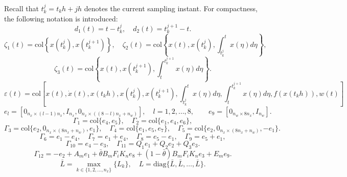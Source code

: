 \documentclass[preprint,review,fleqn,sort&compress,3p]{elsarticle}
\theoremstyle{definition} %
\theoremstyle{definition}%
\begin{document}
Recall that $t_k^j=t_k h+jh$ denotes the current sampling instant. For compactness, the following notation is introduced:
\begin{equation*}
	d_1(t) = t - t^j_k, \quad  
	d_2(t) = t^{j+1}_{k} - t.
\end{equation*}
\begin{equation*}
	\zeta_1(t) = \mathrm{col} \left\{ x(t^j_k),  x(t^{j+1}_{k}) \right\}, \quad
	\zeta_2(t) = \mathrm{col} \left\{ x(t), x(t_k^j), \int_{t_k^j}^t x(\eta) d\eta \right\},
\end{equation*}
\begin{equation*}
	\zeta_3(t) = \mathrm{col} \left\{ x(t), x(t_k^{j+1}), \int_t^{t_k^{j+1}} x(\eta) d\eta \right\}.
\end{equation*}
\begin{equation*}
	\varepsilon(t) = \mathrm{col}\left[
	x(t),   \dot{x}(t),   x(t_k h),
	x(t_k^j),   x(t^{j+1}_k),
	\int_{t_k^j}^{t} x(\eta) d\eta,
	\int_{t}^{t_k^{j+1}} x(\eta) d\eta,
	f(x(t_k h)),  w(t)
	\right]
\end{equation*}
\begin{equation*}
	e_l = \left[ 0_{n_x \times (l-1)n_x}, I_{n_x}, 0_{n_x \times ((8-l)n_x+n_w)} \right],\quad l = 1,2,\dots,8,\qquad e_9 = \left[ 0_{n_w \times 8n_x}, I_{n_w} \right].
\end{equation*}
\begin{equation*}
	\Gamma_{1}=\mathrm{col}\{e_{4},e_{5}\},\quad
	\Gamma_{2}=\mathrm{col}\{e_{1},e_{4},e_{6}\},
\end{equation*}
\begin{equation*}
	\Gamma_{3}=\mathrm{col}\{e_{2},0_{n_x\times (8n_x+n_w)},e_{1}\},\quad
	\Gamma_{4}=\mathrm{col}\{e_{1},e_{5},e_{7}\},\quad
	\Gamma_{5}=\mathrm{col}\{e_{2},0_{n_x\times (8n_x+n_w)},-e_{1}\}.
\end{equation*}
\begin{equation*}
	\Gamma_{6}=e_{1} - e_{4},\quad
	\Gamma_{7}=e_{1} + e_{4},\quad
	\Gamma_{8}=e_{5} - e_{1},\quad
	\Gamma_{9}=e_{5} + e_{1},
\end{equation*}
\begin{equation*}
	\Gamma_{10}=e_{4} - e_{3},
	\quad
	\Gamma_{11}=Q_1e_{1}+Q_2e_{2}+Q_3e_{3}.
\end{equation*}
\begin{equation*}
	\Gamma_{12}= 
	-e_{2} + A_me_{1} 
	+ \bar{\theta} B_{m} F_{i} K_{n} e_{8}
	+(1-\bar{\theta})B_{m} F_{i} K_{n} e_{3}
	+E_m e_{9}.
\end{equation*}
\begin{equation*}
	\bar{L}= \max_{k \in \{1,2,\ldots,n_x\}} \{L_k\},
	\quad
	L = \mathrm{diag}\{\bar{L}, \bar{L}, \dots, \bar{L}\}.
\end{equation*}
\end{document}
